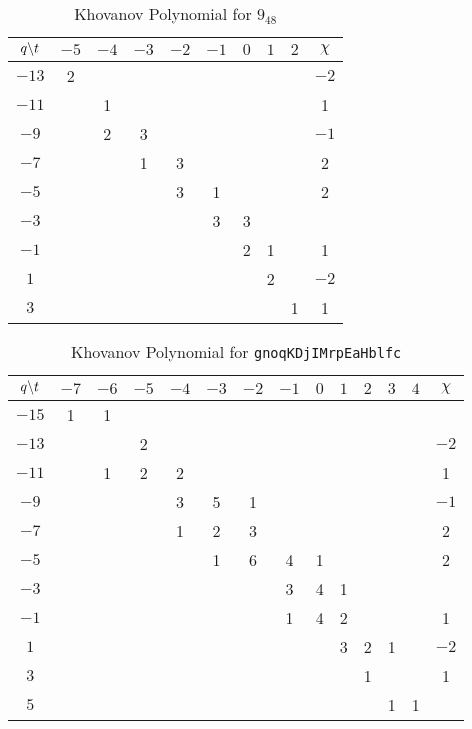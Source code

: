     \begin{table}
        \centering
        \begin{tabular}{| c | c | c | c | c | c | c | c | c | c |}
            \hline
            $q\symbol{92}t$&$-5$&$-4$&$-3$&$-2$&$-1$&$0$&$1$&$2$&$\chi$\\
            \hline
            $-13$&2&&&&&&&&$-2$\\
            \hline
            $-11$&&1&&&&&&&1\\
            \hline
            $-9$&&2&3&&&&&&$-1$\\
            \hline
            $-7$&&&1&3&&&&&2\\
            \hline
            $-5$&&&&3&1&&&&2\\
            \hline
            $-3$&&&&&3&3&&&\\
            \hline
            $-1$&&&&&&2&1&&1\\
            \hline
            $1$&&&&&&&2&&$-2$\\
            \hline
            $3$&&&&&&&&1&1\\
            \hline
        \end{tabular}
        \caption{Khovanov Polynomial for $9_{48}$}
    \end{table}
    \begin{table}
        \centering
        \begin{tabular}{| c | c |c | c | c | c | c | c | c | c | c | c | c | c |}
            \hline
            $q\symbol{92}t$&$-7$&$-6$&$-5$&$-4$&$-3$&$-2$&$-1$&$0$&$1$&$2$&$3$&$4$&$\chi$\\
            \hline
            $-15$&1&1&&&&&&&&&&&\\
            \hline
            $-13$&&&2&&&&&&&&&&$-2$\\
            \hline
            $-11$&&1&2&2&&&&&&&&&1\\
            \hline
            $-9$&&&&3&5&1&&&&&&&$-1$\\
            \hline
            $-7$&&&&1&2&3&&&&&&&2\\
            \hline
            $-5$&&&&&1&6&4&1&&&&&2\\
            \hline
            $-3$&&&&&&&3&4&1&&&&\\
            \hline
            $-1$&&&&&&&1&4&2&&&&1\\
            \hline
            $1$&&&&&&&&&3&2&1&&$-2$\\
            \hline
            $3$&&&&&&&&&&1&&&1\\
            \hline
            $5$&&&&&&&&&&&1&1&\\
            \hline
        \end{tabular}
        \caption{Khovanov Polynomial for \texttt{gnoqKDjIMrpEaHblfc}}
    \end{table}
